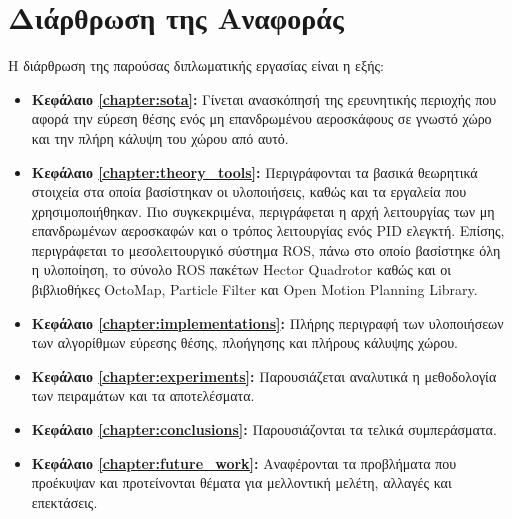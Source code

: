 \section{Διάρθρωση της Αναφοράς}
\label{section:layout}

Η διάρθρωση της παρούσας διπλωματικής εργασίας είναι η εξής:

\begin{itemize}
  \item{\textbf{Κεφάλαιο \ref{chapter:sota}:}
      Γίνεται ανασκόπησή της ερευνητικής περιοχής που αφορά την εύρεση θέσης ενός μη επανδρωμένου αεροσκάφους σε γνωστό χώρο και την πλήρη κάλυψη του χώρου από αυτό.
    }
  \item{\textbf{Κεφάλαιο \ref{chapter:theory_tools}:} Περιγράφονται τα βασικά θεωρητικά στοιχεία στα οποία βασίστηκαν οι υλοποιήσεις, καθώς και τα εργαλεία που χρησιμοποιήθηκαν. Πιο συγκεκριμένα, περιγράφεται η αρχή λειτουργίας των μη επανδρωμένων αεροσκαφών και ο τρόπος λειτουργίας ενός PID ελεγκτή. Επίσης, περιγράφεται το μεσολειτουργικό σύστημα ROS, πάνω στο οποίο βασίστηκε όλη η υλοποίηση, το σύνολο ROS πακέτων Hector Quadrotor καθώς και οι βιβλιοθήκες OctoMap, Particle Filter και Open Motion Planning Library.
    }
  \item{\textbf{Κεφάλαιο \ref{chapter:implementations}:} Πλήρης περιγραφή των υλοποιήσεων των αλγορίθμων εύρεσης θέσης, πλοήγησης και πλήρους κάλυψης χώρου. 
    }
  \item{\textbf{Κεφάλαιο \ref{chapter:experiments}:} Παρουσιάζεται αναλυτικά η μεθοδολογία των
      πειραμάτων και τα αποτελέσματα.
    }
  \item{\textbf{Κεφάλαιο \ref{chapter:conclusions}:} Παρουσιάζονται τα τελικά συμπεράσματα.
    }
  \item{\textbf{Κεφάλαιο \ref{chapter:future_work}:} Αναφέρονται τα
      προβλήματα που προέκυψαν και προτείνονται θέματα για μελλοντική
      μελέτη, αλλαγές και επεκτάσεις.
    }
\end{itemize}